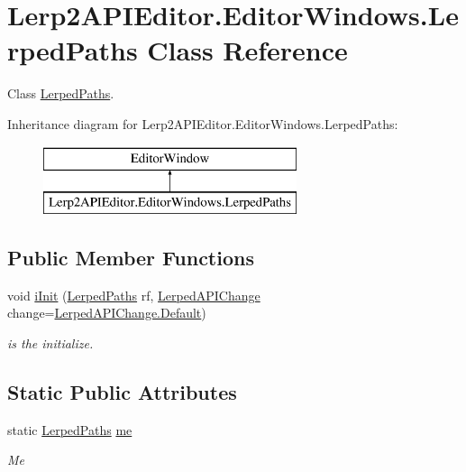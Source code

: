 \hypertarget{class_lerp2_a_p_i_editor_1_1_editor_windows_1_1_lerped_paths}{}\section{Lerp2\+A\+P\+I\+Editor.\+Editor\+Windows.\+Lerped\+Paths Class Reference}
\label{class_lerp2_a_p_i_editor_1_1_editor_windows_1_1_lerped_paths}


Class \hyperlink{class_lerp2_a_p_i_editor_1_1_editor_windows_1_1_lerped_paths}{Lerped\+Paths}.  


Inheritance diagram for Lerp2\+A\+P\+I\+Editor.\+Editor\+Windows.\+Lerped\+Paths\+:\begin{figure}[H]
\begin{center}
\leavevmode
\includegraphics[height=2.000000cm]{class_lerp2_a_p_i_editor_1_1_editor_windows_1_1_lerped_paths}
\end{center}
\end{figure}
\subsection*{Public Member Functions}
\begin{DoxyCompactItemize}
\item 
void \hyperlink{class_lerp2_a_p_i_editor_1_1_editor_windows_1_1_lerped_paths_a7ff1e54adacf9f29a9bacd78f1c9d6ae}{i\+Init} (\hyperlink{class_lerp2_a_p_i_editor_1_1_editor_windows_1_1_lerped_paths}{Lerped\+Paths} rf, \hyperlink{namespace_lerp2_a_p_i_editor_1_1_editor_windows_a7ebc015ae3bb1313ff6c2ba392ffe72c}{Lerped\+A\+P\+I\+Change} change=\hyperlink{namespace_lerp2_a_p_i_editor_1_1_editor_windows_a7ebc015ae3bb1313ff6c2ba392ffe72ca7a1920d61156abc05a60135aefe8bc67}{Lerped\+A\+P\+I\+Change.\+Default})
\begin{DoxyCompactList}\small\item\em is the initialize. \end{DoxyCompactList}\end{DoxyCompactItemize}
\subsection*{Static Public Attributes}
\begin{DoxyCompactItemize}
\item 
static \hyperlink{class_lerp2_a_p_i_editor_1_1_editor_windows_1_1_lerped_paths}{Lerped\+Paths} \hyperlink{class_lerp2_a_p_i_editor_1_1_editor_windows_1_1_lerped_paths_a1160b7dd1dd73b5d2c1fce6752f38bd0}{me}
\begin{DoxyCompactList}\small\item\em Me \end{DoxyCompactList}\end{DoxyCompactItemize}


